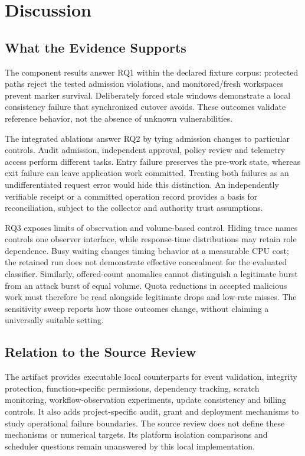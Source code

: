 \documentclass[11pt,a4paper]{article}
\begin{document}
\section{Discussion}
\subsection{What the Evidence Supports}
The component results answer RQ1 within the declared fixture corpus: protected paths reject the tested admission violations, and monitored/fresh workspaces prevent marker survival. Deliberately forced stale windows demonstrate a local consistency failure that synchronized cutover avoids. These outcomes validate reference behavior, not the absence of unknown vulnerabilities.

The integrated ablations answer RQ2 by tying admission changes to particular controls. Audit admission, independent approval, policy review and telemetry access perform different tasks. Entry failure preserves the pre-work state, whereas exit failure can leave application work committed. Treating both failures as an undifferentiated request error would hide this distinction. An independently verifiable receipt or a committed operation record provides a basis for reconciliation, subject to the collector and authority trust assumptions.

RQ3 exposes limits of observation and volume-based control. Hiding trace names controls one observer interface, while response-time distributions may retain role dependence. Busy waiting changes timing behavior at a measurable CPU cost; the retained run does not demonstrate effective concealment for the evaluated classifier. Similarly, offered-count anomalies cannot distinguish a legitimate burst from an attack burst of equal volume. Quota reductions in accepted malicious work must therefore be read alongside legitimate drops and low-rate misses. The sensitivity sweep reports how those outcomes change, without claiming a universally suitable setting.

\subsection{Relation to the Source Review}
The artifact provides executable local counterparts for event validation, integrity protection, function-specific permissions, dependency tracking, scratch monitoring, workflow-observation experiments, update consistency and billing controls. It also adds project-specific audit, grant and deployment mechanisms to study operational failure boundaries. The source review does not define these mechanisms or numerical targets. Its platform isolation comparisons and scheduler questions remain unanswered by this local implementation.
\end{document}
